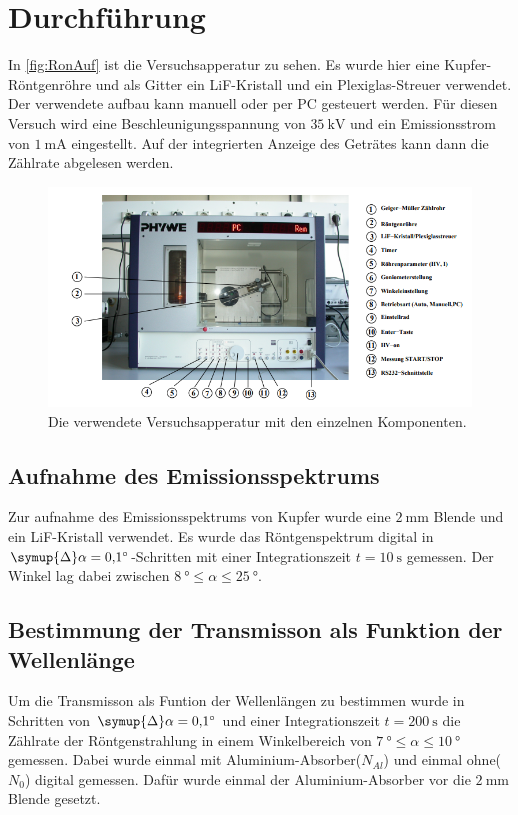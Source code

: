 \section{Durchführung}
\label{sec:Durchführung}
In \autoref{fig:RonAuf} ist die Versuchsapperatur zu sehen. Es wurde hier eine Kupfer-Röntgenröhre und als Gitter ein LiF-Kristall
und ein Plexiglas-Streuer verwendet. Der verwendete aufbau kann manuell oder per PC gesteuert werden. Für diesen Versuch wird
eine Beschleunigungsspannung von $\SI{35}{\kilo\volt}$ und ein Emissionsstrom von $\SI{1}{\milli\ampere}$ eingestellt.
Auf der integrierten Anzeige des Geträtes kann dann die Zählrate abgelesen werden.
\begin{figure}[H]
    \centering
    \includegraphics[scale=1]{content/RontgenAufbau.png}
    \caption{Die verwendete Versuchsapperatur mit den einzelnen Komponenten.\cite{sample}}
    \label{fig:RonAuf}
\end{figure}

\subsection{Aufnahme des Emissionsspektrums}
Zur aufnahme des Emissionsspektrums von Kupfer wurde eine $\SI{2}{\milli\meter}$ Blende und ein LiF-Kristall verwendet.
Es wurde das Röntgenspektrum digital in $\symup{\Delta}\alpha=\SI{0,1}{\degree}$-Schritten mit einer Integrationszeit $t = \SI{10}{\second}$ gemessen.
Der Winkel lag dabei zwischen $\SI{8}{\degree} \leq \alpha \leq \SI{25}{\degree}$.

\subsection{Bestimmung der Transmisson als Funktion der Wellenlänge}
Um die Transmisson als Funtion der Wellenlängen zu bestimmen wurde in Schritten von $\symup{\Delta}\alpha=\SI{0,1}{\degree}$ und
einer Integrationszeit $t = \SI{200}{\second}$ die Zählrate der Röntgenstrahlung in einem Winkelbereich
von $\SI{7}{\degree}\leq \alpha \leq \SI{10}{\degree}$ gemessen. Dabei wurde einmal mit Aluminium-Absorber($N_{Al}$)
und einmal ohne($N_0$) digital gemessen. Dafür wurde einmal der Aluminium-Absorber vor die $\SI{2}{\milli\meter}$ Blende gesetzt.

